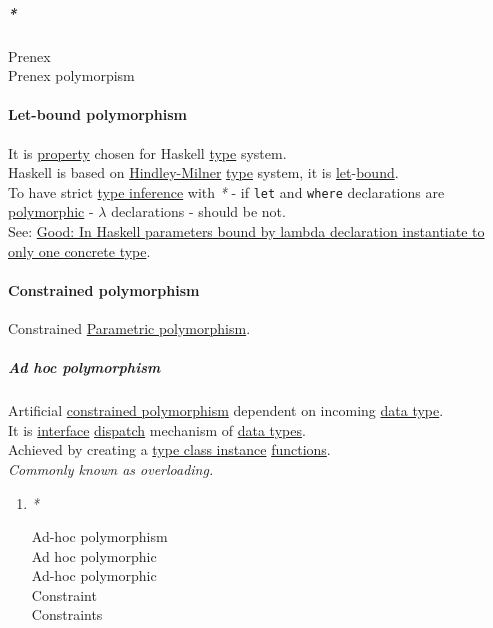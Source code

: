 \documentclass[11pt]{article}
\begin{document}
\subparagraph{\emph{*}}
\label{sec:orge043db4}

\label{org43d21a7}Prenex\\
\label{orgeee0b5a}Prenex polymorpism\\

\paragraph{\label{org1aa66f9}Let-bound polymorphism}
\label{sec:orgd6c6475}
It is \hyperref[org07ca26b]{property} chosen for Haskell \hyperref[org4fbaeb8]{type} system.\\
Haskell is based on \hyperref[org374d650]{Hindley-Milner} \hyperref[org4fbaeb8]{type} system, it is \hyperref[org6b52ae3]{let}-\hyperref[org7d65bda]{bound}.\\
To have strict \hyperref[orgf4f2545]{type inference} with \emph{*} - if \texttt{let} and \texttt{where} declarations are \hyperref[org84d7fee]{polymorphic} - \(\lambda\) declarations - should be not.\\

See: \hyperref[org59cb7cd]{Good: In Haskell parameters bound by lambda declaration instantiate to only one concrete type}.\\

\paragraph{\label{orgc366150}Constrained polymorphism}
\label{sec:orgec3315e}
Constrained \hyperref[org9b7bee7]{Parametric polymorphism}.\\

\subparagraph{\label{orgdf8c6be}Ad hoc polymorphism}
\label{sec:orgc688f39}
Artificial \hyperref[orgc366150]{constrained polymorphism} dependent on incoming \hyperref[org965cde3]{data type}.\\
It is \hyperref[orge564553]{interface} \hyperref[orgddfd699]{dispatch} mechanism of \hyperref[org88981ee]{data types}.\\
Achieved by creating a \hyperref[orgb31808e]{type class instance} \hyperref[org66c5288]{functions}.\\

\emph{Commonly known as overloading.}\\

\begin{enumerate}
\item \emph{*}
\label{sec:orgc76f953}

\label{orgee3950d}Ad-hoc polymorphism\\
\label{orge82f696}Ad hoc polymorphic\\
\label{org66e757b}Ad-hoc polymorphic\\
\label{org7bec652}Constraint\\
\label{org76311a9}Constraints\\
\end{enumerate}
\end{document}
